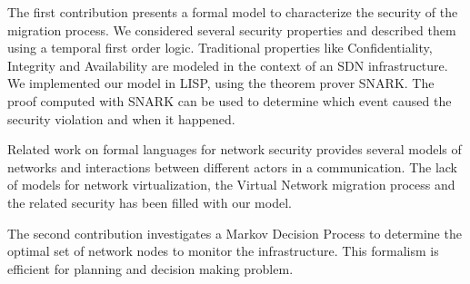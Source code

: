 The first contribution presents a formal model to characterize the security of the migration process. We considered several security properties and described them using a temporal first order logic. Traditional properties like Confidentiality, Integrity and Availability are modeled in the context of an SDN infrastructure.
We implemented our model in LISP, using the theorem prover SNARK.
The proof computed with SNARK can be used to determine which event caused the security violation and when it happened.

Related work on formal languages for network security provides several models of networks and interactions between different actors in a communication. The lack of models for network virtualization, the Virtual Network migration process and the related security has been filled with our model. 

The second contribution investigates a Markov Decision Process to determine the optimal set of network nodes to monitor the infrastructure. This formalism is efficient for planning and decision making problem.


